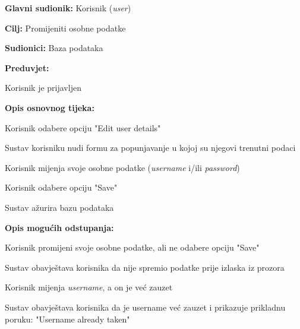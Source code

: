 				\noindent {}
				\begin{packed_item}
					
					\item \textbf{Glavni sudionik: }Korisnik (\textit{user})
					\item  \textbf{Cilj: }Promijeniti osobne podatke
					\item  \textbf{Sudionici: }Baza podataka
				\item  \textbf{Preduvjet: }
				\begin{packed_enum}\item Korisnik je prijavljen\end{packed_enum}
					\item  \textbf{Opis osnovnog tijeka: }
					
					\item[] \begin{packed_enum}
						
						\item Korisnik odabere opciju "Edit user details"
						\item Sustav korisniku nudi formu za popunjavanje u kojoj su njegovi trenutni podaci
						\item Korisnik mijenja svoje osobne podatke (\textit{username} i/ili \textit{password})
						\item Korisnik odabere opciju "Save"
						\item Sustav ažurira bazu podataka
						
					\end{packed_enum}
					
					\item  \textbf{Opis mogućih odstupanja: }
					
					\item[] \begin{packed_item}
						
						\item[1] Korisnik promijeni svoje osobne podatke, ali ne odabere opciju "Save"
						\item[ ] \begin{packed_enum}
							
							\item[1.1] Sustav obavještava korisnika da nije spremio podatke prije izlaska iz prozora
							
						\end{packed_enum}
						
						\item[2] Korisnik mijenja \textit{username}, a on je već zauzet
						\item[ ] \begin{packed_enum}
							
							\item[2.1] Sustav obavještava korisnika da je username već zauzet i
							\newline prikazuje prikladnu poruku: "Username already taken"
							
						\end{packed_enum}
						
					\end{packed_item}
				\end{packed_item}
